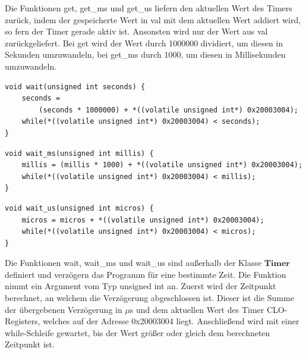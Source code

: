\documentclass[12pt]{article}
\begin{document}
Die Funktionen get, get\_ms und get\_us liefern den aktuellen Wert des Timers zurück, indem der gespeicherte Wert in val mit dem aktuellen Wert addiert wird, so fern der Timer gerade aktiv ist. Ansonsten wird nur der Wert aus val zurückgeliefert. Bei get wird der Wert durch 1000000 dividiert, um diesen in Sekunden umzuwandeln, bei get\_ms durch 1000, um diesen in Millisekunden umzuwandeln.\\
\begin{verbatim}
void wait(unsigned int seconds) {
    seconds = 
        (seconds * 1000000) + *((volatile unsigned int*) 0x20003004);
    while(*((volatile unsigned int*) 0x20003004) < seconds);
}
\end{verbatim}
\begin{verbatim}
void wait_ms(unsigned int millis) {
    millis = (millis * 1000) + *((volatile unsigned int*) 0x20003004);
    while(*((volatile unsigned int*) 0x20003004) < millis);
}
\end{verbatim}
\begin{verbatim}
void wait_us(unsigned int micros) {
    micros = micros + *((volatile unsigned int*) 0x20003004);
    while(*((volatile unsigned int*) 0x20003004) < micros);
}
\end{verbatim}
Die Funktionen wait, wait\_ms und wait\_us sind außerhalb der Klasse $\textbf{Timer}$ definiert und verzögern das Programm für eine bestimmte Zeit. Die Funktion nimmt ein Argument vom Typ unsigned int an. Zuerst wird der Zeitpunkt berechnet, an welchem die Verzögerung abgeschlossen ist. Dieser ist die Summe der übergebenen Verzögerung in $\mu$s und dem aktuellen Wert des Timer CLO-Registers, welches auf der Adresse 0x20003004 liegt. Anschließend wird mit einer while-Schleife gewartet, bis der Wert größer oder gleich dem berechneten Zeitpunkt ist.
\end{document}
